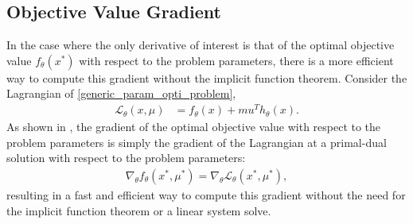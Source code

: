 \subsection{Objective Value Gradient}
%
In the case where the only derivative of interest is that of the optimal objective value $f_\theta(x^*)$ with respect to the problem parameters, there is a more efficient way to compute this gradient without the implicit function theorem. Consider the Lagrangian of \eqref{generic_param_opti_problem},
\begin{align}
    \mathcal{L}_\theta (x, \mu) &= f_\theta(x) + mu^Th_\theta(x).
\end{align}
As shown in \cite{castillo2006}, the gradient of the optimal objective value with respect to the problem parameters is simply the gradient of the Lagrangian at a primal-dual solution with respect to the problem parameters:
\begin{align}
    \nabla_\theta f_\theta(x^*, \mu^*)= \nabla_\theta \mathcal{L}_\theta(x^*, \mu^*), \label{eq:lag_grad}
\end{align}
resulting in a fast and efficient way to compute this gradient without the need for the implicit function theorem or a linear system solve.

